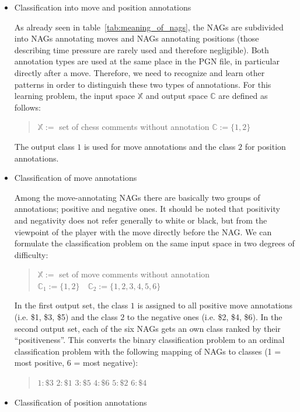 \documentclass[article,type=msc,colorback,accentcolor=tud7b]{tudthesis}
\begin{document}
    \begin{itemize}
      \item Classification into move and position annotations

      As already seen in table~\ref{tab:meaning_of_nags}, the NAGs are subdivided into NAGs annotating moves and NAGs annotating positions (those describing time pressure are rarely used and therefore negligible). Both annotation types are used at the same place in the PGN file, in particular directly after a move. Therefore, we need to recognize and learn other patterns in order to distinguish these two types of annotations. For this learning problem, the input space $\mathbb{X}$ and output space $\mathbb{C}$ are defined as follows:
      \begin{quotation}
        $\mathbb{X}:=$ set of chess comments without annotation \quad $\mathbb{C}:=\{1,2\}$
      \end{quotation}
      The output class $1$ is used for move annotations and the class $2$ for position annotations. 
      \item Classification of move annotations

      Among the move-annotating NAGs there are basically two groups of annotations; positive and negative ones. It should be noted that positivity and negativity does not refer generally to white or black, but from the viewpoint of the player with the move directly before the NAG. We can formulate the classification problem on the same input space in two degrees of difficulty:
      \begin{quotation}
        $\mathbb{X}:=$ set of move comments without annotation \quad $\mathbb{C}_{1}:=\{1,2\} \quad \mathbb{C}_{2}:=\{1,2,3,4,5,6\}$
      \end{quotation}
      In the first output set, the class $1$ is assigned to all positive move annotations (i.e. \$1, \$3, \$5) and the class $2$ to the negative ones (i.e. \$2, \$4, \$6). In the second output set, each of the six NAGs gets an own class ranked by their “positiveness”. This converts the binary classification problem to an ordinal classification problem with the following mapping of NAGs to classes (1 = most positive, 6 = most negative):
      \begin{quotation}
        $1: \$3$ \quad $2: \$1$ \quad $3: \$5$ \quad $4: \$6$ \quad $5: \$2$ \quad $6: \$4$
      \end{quotation}
      \item Classification of position annotations


\end{itemize}
\end{document}
